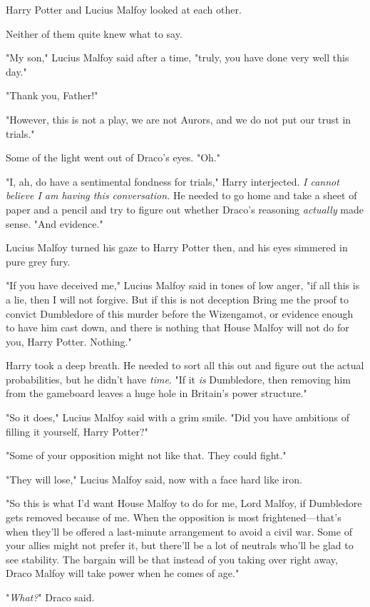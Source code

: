 Harry Potter and Lucius Malfoy looked at each other.

Neither of them quite knew what to say.

"My son," Lucius Malfoy said after a time, "truly, you have done very well this
day."

"Thank you, Father!"

"However, this is not a play, we are not Aurors, and we do not put our trust in
trials."

Some of the light went out of Draco's eyes. "Oh."

"I, ah, do have a sentimental fondness for trials," Harry interjected. \emph{I
cannot believe I am having this conversation.} He needed to go home and take a
sheet of paper and a pencil and try to figure out whether Draco's reasoning
\emph{actually} made sense. "And evidence."

Lucius Malfoy turned his gaze to Harry Potter then, and his eyes simmered in
pure grey fury.

"If you have deceived me," Lucius Malfoy said in tones of low anger, "if all
this is a lie, then I will not forgive. But if this is not deception{\el}
Bring me the proof to convict Dumbledore of this murder before the Wizengamot,
or evidence enough to have him cast down, and there is nothing that House
Malfoy will not do for you, Harry Potter. Nothing."

Harry took a deep breath. He needed to sort all this out and figure out the
actual probabilities, but he didn't have \emph{time}. "If it \emph{is}
Dumbledore, then removing him from the gameboard leaves a huge hole in
Britain's power structure."

"So it does," Lucius Malfoy said with a grim smile. "Did you have ambitions of
filling it yourself, Harry Potter?"

"Some of your opposition might not like that. They could fight."

"They will lose," Lucius Malfoy said, now with a face hard like iron.

"So this is what I'd want House Malfoy to do for me, Lord Malfoy, if Dumbledore
gets removed because of me. When the opposition is most frightened---that's
when they'll be offered a last-minute arrangement to avoid a civil war. Some of
your allies might not prefer it, but there'll be a lot of neutrals who'll be
glad to see stability. The bargain will be that instead of you taking over
right away, Draco Malfoy will take power when he comes of age."

"\emph{What?}" Draco said.

